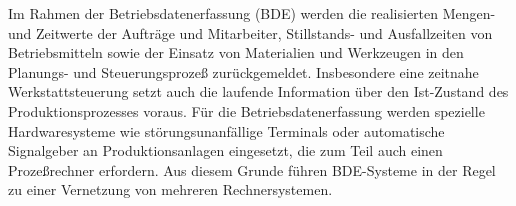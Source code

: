 Im Rahmen der Betriebsdatenerfassung (BDE) werden die realisierten Mengen- und Zeitwerte der Aufträge und Mitarbeiter, Stillstands- und Ausfallzeiten von Betriebsmitteln sowie der Einsatz von Materialien und Werkzeugen in den Planungs- und Steuerungsprozeß zurückgemeldet. Insbesondere eine zeitnahe Werkstattsteuerung setzt auch die laufende Information über den Ist-Zustand des Produktionsprozesses voraus. Für die Betriebsdatenerfassung werden spezielle Hardwaresysteme wie störungsunanfällige Terminals oder automatische Signalgeber an Produktionsanlagen eingesetzt, die zum Teil auch einen Prozeßrechner erfordern. Aus diesem Grunde führen BDE-Systeme in der Regel zu einer Vernetzung von mehreren Rechnersystemen.

